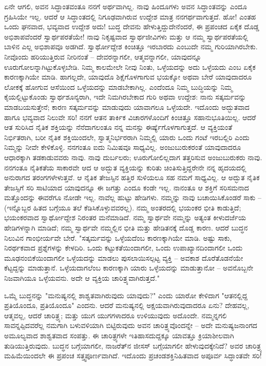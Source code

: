 ಏನೇ ಆಗಲಿ, ಅವನ ಸಿದ್ಧಾಂತವಂತೂ ನನಗೆ ಅರ್ಥವಾಗಿಲ್ಲ. ನಾವು ಹಿಂದೂಗಳು ಅವನ ಸಿದ್ಧಾಂತವನ್ನು ಎಂದೂ ಗ್ರಹಿಸಿಯೇ ಇಲ್ಲ. ಆದರೆ ಆ ಸಿದ್ಧಾಂತದಲ್ಲಿ ನಿಗೂಢವಾಗಿರುವ ಉದ್ದೇಶ ಮಾತ್ರ ನನಗರ್ಥವಾಗುತ್ತದೆ. ಹೋ! ಎಂತಹ ಒಂದು ಘನವಾದ, ಭವ್ಯವಾದ ಉದ್ದೇಶ ಅದು! ಬುದ್ಧ ದೇವನು ಹೇಳುತ್ತಿದ್ದುದೇನೆಂದರೆ, ಈ ಪ್ರಪಂಚದ ಏಕೈಕ ದೊಡ್ಡ ಅಭಿಶಾಪವೆಂದರೆ ಸ್ವಾರ್ಥಪರತೆಯೇ! ನಾವು ನಿಕೃಷ್ಟವಾದ ಸ್ವಾರ್ಥಜೀವಿಗಳು ಮತ್ತು ಆ ನಮ್ಮ ಸ್ವಾರ್ಥಪರತೆಯಲ್ಲಿ ಬಾಳಿನ ಎಲ್ಲ ಅಭಿಶಾಪವೂ ಅಡಗಿದೆ. ಸ್ವಾರ್ಥೋದ್ದೇಶ ಕಿಂಚಿತ್ತೂ ಇರಬಾರದು ಎಂಬುದೇ ನಮ್ಮ ಗುರಿಯಾಗಿರಬೇಕು. ನೀವೊಂದು ಹರಿಯುತ್ತಿರುವ ನೀರಿನಂತೆ – ದೇವರನ್ನಾಗಲೀ, ಆತ್ಮವನ್ನಾಗಲೀ, ಯಾವುದನ್ನೂ ಊರುಗೋಲನ್ನಾಗಿಟ್ಟುಕೊಳ್ಳಬೇಡಿ. ನಿಮ್ಮ ಕಾಲಮೇಲೇ ನೀವು ನಿಂತು, ಒಳ್ಳೆಯದನ್ನು ಅದು ಒಳ್ಳೆಯದು ಎಂಬ ಏಕೈಕ ಕಾರಣಕ್ಕಾಗಿಯೇ ಮಾಡಿ. ಹಾಗಲ್ಲದೇ, ಯಾವುದೊ ಶಿಕ್ಷೆಗೊಳಗಾಗುವ ಭಯಕ್ಕೋ ಅಥವಾ ಬೇರೆ ಯಾವುದಾದರೂ ಲೋಕಕ್ಕೆ ಹೋಗುವ ಆಸೆಯಿಂದ ಒಳ್ಳೆಯದನ್ನು ಮಾಡಬೇಕಾಗಿಲ್ಲ. ಎಂದೆಂದೂ ನಿಮ್ಮ ಬುದ್ಧಿಯನ್ನು ನಿಮ್ಮ ಕೈಯಲ್ಲಿಟ್ಟುಕೊಂಡು ಸ್ವಾರ್ಥಶೂನ್ಯರಾಗಿ, ಇದೇ ನಿಮಗಿರಬೇಕಾದ ಗುರಿ ಅಥವಾ ಉದ್ದೇಶ: ನಾನು ಸತ್ಕರ್ಮವನ್ನು ಮಾಡಬಯಸುತ್ತೇನೆ; ಕಾರಣ ಸತ್ಕರ್ಮವನ್ನು ಮಾಡುವುದು ಯಾವಾಗಲೂ ಒಳ್ಳೆಯದೇ. ಇದೊಂದು ಅದ್ಭುತವಾದ ಹಾಗೂ ಭವ್ಯವಾದ ನಿಲುವೇ ಸರಿ! ನನಗೆ ಆತನ ತಾರ್ಕಿಕ ವಿಚಾರಗಳೊಂದಿಗೆ ಕಿಂಚಿತ್ತೂ ಸಹಾನುಭೂತಿಯಿಲ್ಲ. ಆದರೆ ಆತ ಸುರಿಸಿದ ನೈತಿಕ ಶಕ್ತಿಯನ್ನು ನೆನೆದಾಗಲಂತೂ ನನ್ನ ಮನಸ್ಸು ಈರ್ಷ್ಯೆಗೊಳಗಾಗುತ್ತದೆ. ಆ ವ್ಯಕ್ತಿಯಂತೆ ನಿರ್ಭಿತರಾಗಿ, ಬರೀ ನೈತಿಕ ಶಕ್ತಿಯಿಂದಲೇ, ಸ್ವಾತ್ಮನಿರ್ಭರರಾಗಿ ನಿಮ್ಮಲ್ಲಿ ಯಾರು ಒಂದು ಗಂಟೆ ಇರಬಲ್ಲಿರಿ ಎಂದು ನಿಮ್ಮನ್ನು ನೀವೇ ಕೇಳಿಕೊಳ್ಳಿ. ನನಗಂತೂ ಐದು ನಿಮಿಷವೂ ಸಾಧ್ಯವಿಲ್ಲ. ಅಂಜುಬುರುಕರಂತೆ ಯಾವುದಾದರೂ ಆಧಾರಕ್ಕಾಗಿ ತಡಕಾಡುವವರು ನಾವು. ನಾವು ದುರ್ಬಲರು; ಊರುಗೋಲಿಲ್ಲದಾಗ ತತ್ತರಿಸುವ ಅಂಜುಬುರುಕರು ನಾವು. ನನಗಂತೂ ನೈತಿಕತೆಯ ಸಾಕಾರವೇ ಆದ ಆ ಅದ್ಭುತ ವ್ಯಕ್ತಿಯನ್ನು ಕುರಿತು ಚಿಂತಿಸುತ್ತಿದ್ದರೇನೇ ನನ್ನ ಹೃದಯದಲ್ಲಿ ಅನುರಾಗದ ತರಂಗಗಳೇಳುತ್ತವೆ. ಆ ನೈತಿಕ ತೇಜಸ್ಸಿನ ಹತ್ತಿರ ಸುಳಿಯಲೂ ಸಹ ನಮಗೆ ಸಾಧ್ಯವಿಲ್ಲ. ಆ ಅದ್ಭುತ ನೈತಿಕ ತೇಜಸ್ಸಿಗೆ ಸರಿ ಸಾಟಿಯಾದ ಯಾವುದನ್ನೂ ಈ ಜಗತ್ತು ಎಂದೂ ಕಂಡೇ ಇಲ್ಲ. ನಾನಂತೂ ಆ ಶಕ್ತಿಗೆ ಸರಿಸಮನಾದ ಮತ್ತೊಂದನ್ನು ಈವರೆಗೂ ನೋಡೇ ಇಲ್ಲ. ನಾವೆಲ್ಲ ಹುಟ್ಟು ಹೇಡಿಗಳು. ನಮ್ಮನ್ನು ನಾವು ಬಚಾಯಿಸಿಕೊಂಡರೆ ಸಾಕು – (ಇನ್ನೊಬ್ಬರ ಹಿತದ ಬಗ್ಗೆಯೂ ತಲೆ ಕೆಡಿಸಿಕೊಳ್ಳುವವರಲ್ಲ). ನಮ್ಮ ಅಂತರದಲ್ಲಿ ಭಯಂಕರ ಭೀತಿ ಕಾಡುತ್ತಿದೆ; ಭಯಂಕರವಾದ ಸ್ವಾರ್ಥೋದ್ದೇಶ ನಿರಂತರ ಮನೆಮಾಡಿದೆ. ನಮ್ಮ ಸ್ವಾರ್ಥವೇ ನಮ್ಮನ್ನು ಅತ್ಯಂತ ಕೀಳುದರ್ಜೆಯ ಹೇಡಿಗಳನ್ನಾಗಿ ಮಾಡಿದೆ; ನಮ್ಮ ಸ್ವಾರ್ಥವೇ ನಮ್ಮಲ್ಲಿನ ಭೀತಿ ಮತ್ತು ಹೇಡಿತನಕ್ಕೆ ದೊಡ್ಡ ಕಾರಣ. ಆದರೆ ಬುದ್ಧನ ನಿಲುವಿನ ಗಾಂಭೀರ್ಯವೇ ಬೇರೆ. "ಸತ್ಕರ್ಮವನ್ನು ಒಳ್ಳೆಯದೆಂಬ ಕಾರಣಕ್ಕಾಗಿಯೇ ಮಾಡಿ. ಅಷ್ಟು ಸಾಕು, ನಿರರ್ಥಕವಾದ ಪ್ರಶ್ನೆಗಳನ್ನು ಕೇಳದಿರಿ. ಒಂದು ಕಟ್ಟುಕತೆಯಿಂದಾಗಲೀ, ಒಂದು ಉಪಾಖ್ಯಾನದಿಂದಾಗಲೀ ಒಂದು ಮೂಢನಂಬಿಕೆಯಿಂದಾಗಲೀ ಒಳ್ಳೆಯದನ್ನು ಮಾಡಲು ಪುಸಲಾಯಿಸಲ್ಪಟ್ಟ ವ್ಯಕ್ತಿ – ಅವಕಾಶ ದೊರೆತೊಡನೆಯೇ ಕೆಟ್ಟದ್ದನ್ನು ಮಾಡುತ್ತಾನೆ. ಒಳ್ಳೆಯದಾಗಲೆಂಬ ಕಾರಣಕ್ಕಾಗಿ ಯಾರು ಒಳ್ಳೆಯದನ್ನು ಮಾಡುತ್ತಾನೋ – ಅವನೊಬ್ಬನೇ ನಿಜವಾಗಿಯೂ ಒಳ್ಳೆಯವನು. ಅದೇ ಆ ವ್ಯಕ್ತಿಯ ಚಾರಿತ್ರ್ಯವಾಗಿರುತ್ತದೆ."

ಒಮ್ಮೆ ಬುದ್ಧನನ್ನು "ಮನುಷ್ಯನಲ್ಲಿ ಶಾಶ್ವತವಾಗಿರುವುದು ಯಾವುದು?" ಎಂದು ಯಾರೋ ಕೇಳಿದಾಗ "ಆತನಲ್ಲಿದ್ದ ಪ್ರತಿಯೊಂದೂ, ಪ್ರತಿಯೊಂದೂ" ಎಂದನು. ಆದರೆ ಮನುಷ್ಯನಲ್ಲಿ ಅಕ್ಷಯವಾಗಿರುವುದಾದರೂ ಏನು? ದೇಹವಲ್ಲ, ಆತ್ಮವಲ್ಲ, ಆದರೆ ಚಾರಿತ್ರ್ಯ; ಮತ್ತು ಯುಗ ಯುಗಗಳಾದರೂ ಉಳಿಯುವುದು ಅದೊಂದೇ. ನಮ್ಮನ್ನಗಲಿ ಸಾವನ್ನಪ್ಪಿದವರೆಲ್ಲ ನಮಗಾಗಿ ಬಳುವಳಿಯಾಗಿ ಬಿಟ್ಟಿರುವುದು ಅವನ ಚಾರಿತ್ರ್ಯವೊಂದನ್ನೇ – ಅದೇ ಮನುಷ್ಯಜನಾಂಗದ ಅಮೂಲ್ಯವಾದ ಶಾಶ್ವತವಾದ ಸಂಪತ್ತು. ಈ ಚಾರಿತ್ರ್ಯಗಳೇ ಇತಿಹಾಸದುದ್ದಕ್ಕೂ ಯಾವತ್ತೂ ಕ್ರಿಯಾಶೀಲವಾಗಿ ತುಡಿಯುತ್ತಿರುವುದು. ಬುದ್ಧನ ಬಗ್ಗೆಯಾಗಲೀ, ನಾಜರೆತ್‌ನ ಜೀಸಸ್ ಬಗ್ಗೆಯಾಗಲೀ ಹೇಳುವುದಕ್ಕೇನಿದೆ? ಅವರ ಚಾರಿತ್ರ್ಯ ಮಹಿಮೆಯಿಂದಲೇ ಈ ಪ್ರಪಂಚ ಸತ್ತ್ವಪೂರ್ಣವಾಗಿದೆ. ಇದೊಂದು ಪ್ರಚಂಡಶಕ್ತಿನಿಹಿತವಾದ ಅಪೂರ್ವ ಸಿದ್ಧಾಂತವೇ ಸರಿ!

